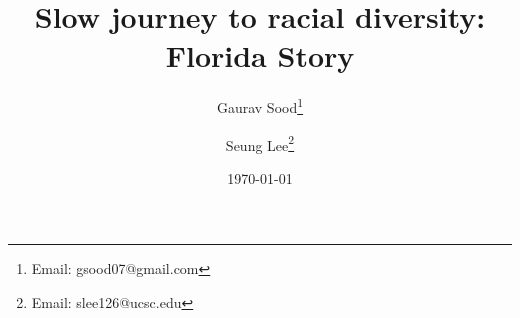 %
\title{{\bf Slow journey to racial diversity: Florida Story}}
%
\author{
  Gaurav Sood\thanks{
  Email: gsood07@gmail.com} \\
\and
  Seung Lee\thanks{
  Email: slee126@ucsc.edu} \\
}
%
\date{\today}
